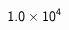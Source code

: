 \documentclass{article}
\begin{document}
\[
\color[rgb]{0.000,0.000,0.000} {
\textrm{\sffamily 1.0}\times \textrm{\sffamily  10}^{\textrm{\sffamily\scriptsize 4}}}
\]
\end{document}
